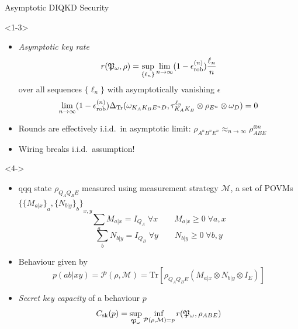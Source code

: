 \documentclass[xcolor=dvipsnames]{beamer}
\newcommand{\?}{\mathrel{?}} %
\newcommand{\Tr}{\mathrm{Tr}} %
\newcommand{\sM}{\mathcal{M}}
\newcommand{\cP}{\mathcal{P}}
\newcommand{\rob}{\rm rob}
\newcommand{\erob}[1]{\epsilon_{\rob}^{(#1)}}
\newcommand{\sk}{\rm sk}
\begin{document}
\begin{frame}{Asymptotic DIQKD Security}
  \begin{onlyenv}<1-3>
    \begin{itemize}[<+->]
    \item \emph{Asymptotic key rate}
      \[ r(\mathfrak{P}_{\omega}, \rho) = \sup_{\{\ell_n\}} \lim_{n\to\infty} (1-\erob{n}) \frac{\ell_n}{n} \]
      over all sequences \(\{\ell_n\}\) with asymptotically vanishing \(\epsilon\)
    \[ \lim_{n\to\infty} (1-\erob{n})\Delta_{\Tr}(\omega_{K_A K_B E^n D}, \tau_{K_A K_B}^{\ell_n} \otimes \rho_{E^n} \otimes \omega_{D}) = 0 \]
    \item Rounds are effectively i.i.d.\ in asymptotic limit: \(\rho_{A^n B^n E^n} \approx_{n\to\infty} \rho_{ABE}^{\otimes n}\)
    \item \alert{Wiring breaks i.i.d.\ assumption!}
  \end{itemize}
  \end{onlyenv}
  \begin{onlyenv}<4->
    \begin{itemize}[<+->]
    \item qqq state \(\rho_{Q_A Q_B E}\) measured using measurement strategy \(\sM\), a set of POVMs \({\{{\{M_{a|x}\}}_{a}, {\{N_{b|y}\}}_{b}\}}_{x,y}\)
    \[ \sum_{a} M_{a|x} = I_{Q_A}\;\forall x \qquad M_{a|x} \geq 0\;\forall a, x \]
    \[ \sum_{b} N_{b|y} = I_{Q_B}\;\forall y \qquad N_{b|y} \geq 0\;\forall b, y \]
  \item Behaviour given by
      \[ p(ab|xy) = \cP(\rho, \sM) = \Tr\left[\rho_{Q_A Q_B E} \left(M_{a|x} \otimes N_{b|y} \otimes I_{E}\right) \right] \]
    \item \emph{Secret key capacity} of a behaviour \(p\)
      \[ C_{\sk}(p) = \sup_{\mathfrak{P}_{\omega}} \inf_{ \substack{
            \cP(\rho, \sM) = p
        }
      } r(\mathfrak{P}_{\omega}, \rho_{ABE}) \]
  \end{itemize}
  \end{onlyenv}
\end{frame}
\end{document}
